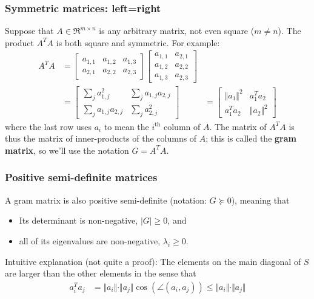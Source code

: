 \documentclass{beamer}
\begin{document}

\begin{frame}
  \frametitle{Symmetric matrices: left=right}

  Suppose that $A\in\Re^{m\times n}$ is any arbitrary matrix, not even
  square ($m\ne n$).  The product $A^TA$ is both square and symmetric.
  For example:
  \begin{align*}
    A^TA &= \left[\begin{array}{ccc}a_{1,1}&a_{1,2}&a_{1,3}\\a_{2,1}&a_{2,2}&a_{2,3}\end{array}\right]
    \left[\begin{array}{cc}a_{1,1}&a_{2,1}\\a_{1,2}&a_{2,2}\\a_{1,3}&a_{2,3}\end{array}\right]\\
    &=
    \left[\begin{array}{cc}\sum_ja_{1,j}^2&\sum_ja_{1,j}a_{2,j}\\\sum_ja_{1,j}a_{2,j}&\sum_ja_{2,j}^2
      \end{array}\right]
    &=
    \left[\begin{array}{cc}\Vert a_1\Vert^2&a_1^Ta_2\\a_1^Ta_2&\Vert a_2\Vert^2
      \end{array}\right]
  \end{align*}
  where the last row uses $a_i$ to mean the $i^{\textrm{th}}$ column
  of $A$.  The matrix of $A^TA$ is thus the matrix of inner-products
  of the columns of $A$; this is called the {\bf gram matrix}, so
  we'll use the notation $G=A^TA$.
\end{frame}

\begin{frame}
  \frametitle{Positive semi-definite matrices}

  A gram matrix is also positive semi-definite (notation: $G\succeq
  0$), meaning that
  \begin{itemize}
  \item Its determinant is non-negative, $|G|\ge 0$, and
  \item all of its eigenvalues are non-negative, $\lambda_i \ge 0$.
  \end{itemize}
  Intuitive explanation (not quite a proof): The elements on the main
  diagonal of $S$ are larger than the other elements in the sense that
  \begin{align*}
    a_i^Ta_j &= \Vert a_i\Vert\cdot\Vert a_j\Vert\cos\left(\angle(a_i,a_j)\right)\le\Vert a_i\Vert\cdot
    \Vert a_j\Vert
  \end{align*}
\end{frame}
\end{document}

